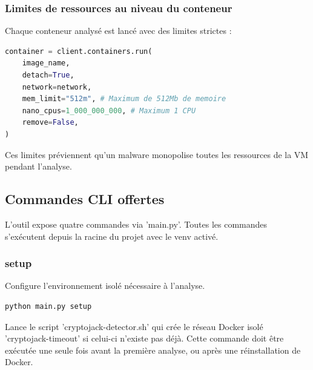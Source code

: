 \subsubsection{Limites de ressources au niveau du conteneur}
Chaque conteneur analysé est lancé avec des limites strictes :
\begin{lstlisting}[language=python, caption=programme de lancement du conteneur]
container = client.containers.run(
    image_name,
    detach=True,
    network=network,
    mem_limit="512m", # Maximum de 512Mb de memoire
    nano_cpus=1_000_000_000, # Maximum 1 CPU
    remove=False,
)
\end{lstlisting}
Ces limites préviennent qu'un malware monopolise toutes les ressources de la VM pendant l'analyse. \\
\subsection{Commandes CLI offertes}
L'outil expose quatre commandes via 'main.py'. Toutes les commandes s'exécutent depuis la racine du projet avec le venv activé.
\subsubsection{setup}
Configure l'environnement isolé nécessaire à l'analyse. \\
\begin{lstlisting}[language=bash, caption=commande setup]
python main.py setup
\end{lstlisting}
Lance le script 'cryptojack-detector.sh' qui crée le réseau Docker isolé 'cryptojack-timeout' si celui-ci n'existe pas déjà. Cette commande doit être exécutée une seule fois avant la première analyse, ou après une réinstallation de Docker. \\
